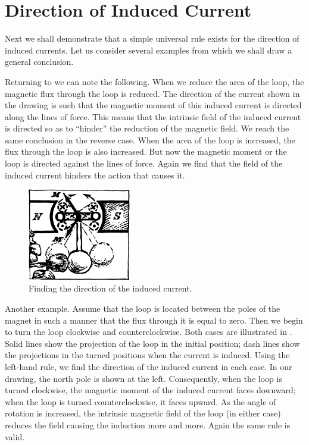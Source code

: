 \section{Direction of Induced Current}

Next we shall demonstrate that a simple universal rule exists for the direction of induced currents. Let us consider several examples from which we shall draw a general conclusion.

Returning to  we can note the following. When we reduce the area of the loop, the magnetic flux through the loop is reduced. The direction of the current shown in the drawing is such that the magnetic moment of this induced current is directed along the lines of force. This means that the intrinsic field of the induced current is directed so as to ``hinder'' the reduction of the magnetic field. We reach the same conclusion in the reverse case. When the area of the loop is increased, the flux through the loop is also increased. But now the magnetic moment or the loop is directed against the lines of force. Again we find that the field of the induced current hinders the action that causes it.

\begin{figure}[!ht]
\centering
\includegraphics[width=0.4\textwidth]{figures/fig-03-09.pdf}
\caption{Finding the direction of the induced current.}
\label{fig-3.9}
\end{figure}


Another example. Assume that the loop is located between the poles of the magnet in such a manner that the flux through it is equal to zero. Then we begin to turn the loop clockwise and counterclockwise. Both cases are illustrated in . Solid lines show the projection of the loop in the initial position; dash lines show the projections in the turned positions when the current is induced. Using the left-hand rule, we find the direction of the induced current in each case. In our drawing, the north pole is shown at the left. Consequently, when the loop is turned clockwise, the magnetic moment of the induced current faces downward; when the loop is turned counterclockwise, it faces upward. As the angle of rotation is increased, the intrinsic magnetic field of the loop (in either case) reduces the field causing the induction more and more. Again the same rule is valid.


